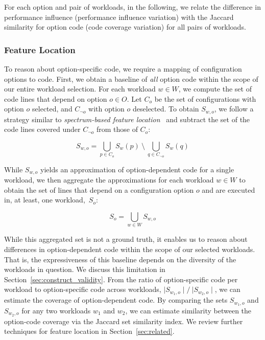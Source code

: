 {For each option and pair of workloads, in the following, we relate the difference in performance influence (performance influence variation) with the Jaccard similarity for option code (code coverage variation) for all pairs of workloads.

\subsubsection{Feature Location}
To reason about option-specific code, we require a mapping of configuration options to code. First, we obtain a baseline of \textit{all} option code within the scope of our entire workload selection. For each workload $w \in W$, we compute the set of code lines that depend on option $o \in O$. Let $C_{o}$ be the set of configurations with option $o$ selected, and $C_{\neg o}$ with option $o$ deselected. To obtain $S_{w, o}$, we follow a strategy similar to \textit{spectrum-based feature location}~\cite{michelon_spectrum_2021} and subtract the set of the code lines covered under $C_{\neg o}$ from those of $C_{o}$:

\begin{equation}%
	S_{w, o} = \bigcup_{p \in C_{o}} S_{w}(p) ~ \setminus ~ \bigcup_{q \in C_{\neg o}} S_{w}(q)
\end{equation}

While $S_{w, o}$ yields an approximation of option-dependent code for a single workload, we then aggregate the approximations for each workload $w\in W$ to obtain the set of lines that depend on a configuration option $o$ and are executed in, at least, one workload,~$S_{o}$: 

\begin{equation}
	S_{o} = \bigcup_{w \in W} S_{w, o}
\end{equation}

While this aggregated set is not a ground truth, it enables us to reason about differences in option-dependent code within the scope of our selected workloads. That is, the expressiveness of this baseline depends on the diversity of the workloads in question. We discuss this limitation in Section~\ref{sec:construct_validity}. From the ratio of option-specific code per workload to option-specific code across workloads, $\mid S_{w_1, o}\mid/~{\mid S_{w_2, o}\mid}$, we can estimate the coverage of option-dependent code. By comparing the sets $S_{w_1, o}$ and $S_{w_2, o}$ for any two workloads $w_1$ and $w_2$, we can estimate similarity between the option-code coverage via the Jaccard set similarity index. We review further techniques for feature location in Section~\ref{sec:related}.

}
